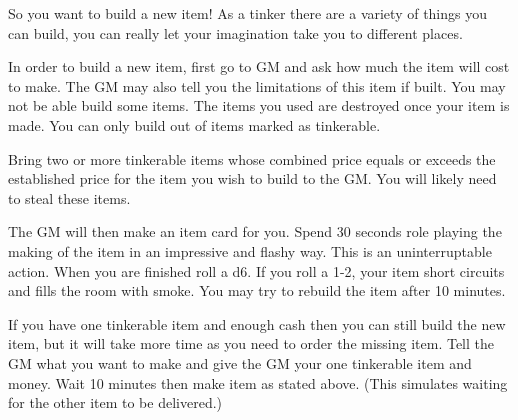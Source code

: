 \documentclass[green]{LRSguildcamp1}
\begin{document}
\name{\gTinkering{}}

So you want to build a new item! As a tinker there are a variety of things you can build, you can really let your imagination take you to different places. 

In order to build a new item, first go to GM and ask how much the item will cost to make. The GM may also tell you the limitations of this item if built. You may not be able build some items. The items you used are destroyed once your item is made. You can only build out of items marked as tinkerable.

Bring two or more tinkerable items whose combined price equals or exceeds the established price for the item you wish to build to the GM. You will likely need to steal these items. 

The GM will then make an item card for you. Spend 30 seconds role playing the making of the item in an impressive and flashy way. This is an uninterruptable action. When you are finished roll a d6.  If you roll a 1-2, your item short circuits and fills the room with smoke. You may try to rebuild the item after 10 minutes. 

If you have one tinkerable item and enough cash then you can still build the new item, but it will take more time as you need to order the missing item. Tell the GM what you want to make and give the GM your one tinkerable item and money. Wait 10 minutes then make item as stated above. (This simulates waiting for the other item to be delivered.) 

\end{document}
